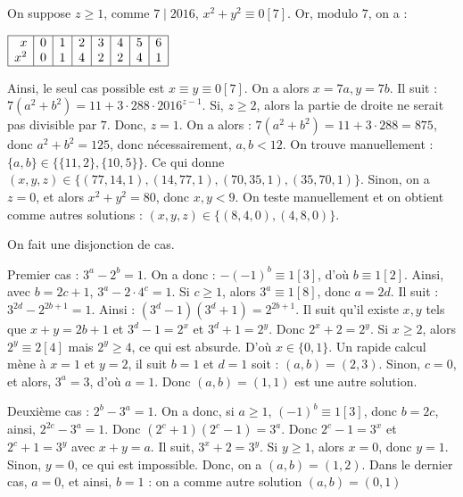 \begin{sol}  
On suppose $z\geq1$, comme $7\mid 2016$, $x^2+y^2\equiv0[7]$.
Or, modulo $7$, on a :

$\begin{array}{|r|c|c|c|c|c|c|l|}
 \hline
 x & 0 & 1 & 2 & 3 & 4 & 5 & 6 \\
 x^2 & 0 & 1 & 4 & 2 & 2 & 4 & 1  \\
 \hline
 \end{array}$
 
 Ainsi, le seul cas possible est $x\equiv y \equiv 0[7]$. On a alors $x=7a,y=7b$. Il suit : $7(a^2+b^2)=11+3\cdot288\cdot 2016^{z-1}$. Si, $z\geq2$, alors la partie de droite ne serait pas divisible par $7$. Donc, $z=1$. On a alors : $7(a^2+b^2)=11+3\cdot288=875$, donc $a^2+b^2=125$, donc nécessairement, $a,b<12$.
 On trouve manuellement : $\{a,b\}\in\{\{11,2\},\{10,5\} \}$.
 Ce qui donne $(x,y,z)\in\{(77,14,1),(14,77,1),(70,35,1),(35,70,1)\}$.
 Sinon, on a $z=0$, et alors $x^2+y^2=80$, donc $x,y<9$. On teste manuellement et on obtient comme autres solutions : $(x,y,z)\in\{(8,4,0),(4,8,0)\}$.
\end{sol}


\begin{sol} On fait une disjonction de cas. 

Premier cas : 
$3^a-2^b=1$. On a donc : $-(-1)^b\equiv 1 [3]$, d'où $b\equiv 1 [2]$.
Ainsi, avec $b=2c+1$, $3^a-2\cdot4^c=1$. Si $c\geq1$, alors $3^a\equiv 1 [8]$, donc $a=2d$. Il suit : $3^{2d}-2^{2b+1}=1$.
Ainsi : $(3^d-1)(3^d+1)=2^{2b+1}$.
Il suit qu'il existe $x,y$ tels que $x+y=2b+1$ et $3^d-1=2^x$ et $3^d+1=2^y$. Donc $2^x+2=2^y$. Si $x\geq2$, alors $2^y\equiv2[4]$ mais $2^y\geq4$, ce qui est absurde. D'où $x\in\{0,1\}$.
Un rapide calcul mène à $x=1$ et $y=2$, il suit $b=1$ et $d=1$ soit : $(a,b)=(2,3)$.
Sinon, $c=0$, et alors, $3^a=3$, d'où $a=1$. Donc $(a,b)=(1,1)$ est une autre solution.

Deuxième cas : 
$2^b-3^a=1$. On a donc, si $a\geq1$, $(-1)^b\equiv 1 [3]$, donc $b=2c$, ainsi, $2^{2c}-3^a=1$. Donc $(2^c+1)(2^c-1)=3^a$. Donc $2^c-1=3^x$ et $2^c+1=3^y$ avec $x+y=a$. Il suit, $3^x+2=3^y$. Si $y\geq1$, alors $x=0$, donc $y=1$. Sinon, $y=0$, ce qui est impossible.
Donc, on a $(a,b)=(1,2)$.
Dans le dernier cas, $a=0$, et ainsi, $b=1$ : on a comme autre solution $(a,b)=(0,1)$
\end{sol}



